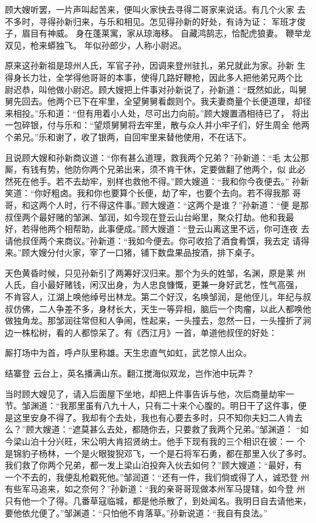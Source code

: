顾大嫂听罢，一片声叫起苦来，便叫火家快去寻得二哥家来说话。有几个火家
去不多时，寻得孙新归来，与乐和相见。怎见得孙新的好处，有诗为证：
军班才俊子，眉目有神威。
身在蓬莱寓，家从琼海移。
自藏鸿鹄志，恰配虎狼妻。
鞭举龙双见，枪来蟒独飞。
年似孙郎少，人称小尉迟。

原来这孙新祖是琼州人氏，军官子孙，因调来登州驻扎，弟兄就此为家。孙新
生得身长力壮，全学得他哥哥的本事，使得几路好鞭枪，因此多人把他弟兄两个比
尉迟恭，叫他做小尉迟。顾大嫂把上件事对孙新说了，孙新道：“既然如此，叫舅
舅先回去。他两个已下在牢里，全望舅舅看觑则个。我夫妻商量个长便道理，却径
来相投。”乐和道：“但有用着小人处，尽可出力向前。”顾大嫂置酒相待已了，
将出一包碎银，付与乐和：“望烦舅舅将去牢里，散与众人并小牢子们，好生周全
他两个弟兄。”乐和谢了，收了银两，自回牢里来替他使用，不在话下。

且说顾大嫂和孙新商议道：“你有甚么道理，救我两个兄弟？”孙新道：“毛
太公那厮，有钱有势，他防你两个兄弟出来，须不肯干休，定要做翻了他两个，似
此必然死在他手。若不去劫牢，别样也救他不得。”顾大嫂道：“我和你今夜便去。”
孙新笑道：“你好粗卤。我和你也要算个长便，劫了牢，也要个去向。若不得我那
哥哥，和这两个人时，行不得这件事。”顾大嫂道：“这两个是谁？”孙新道：“便
是那叔侄两个最好赌的邹渊、邹润，如今现在登云山台峪里，聚众打劫。他和我最
好，若得他两个相帮助，此事便成。”顾大嫂道：“登云山离这里不远，你可连夜
去请他叔侄两个来商议。”孙新道：“我如今便去。你可收拾了酒食肴馔，我去定
请得来。”顾大嫂分付火家，宰了一口猪，铺下数盘果品按酒，排下桌子。

天色黄昏时候，只见孙新引了两筹好汉归来。那个为头的姓邹，名渊，原是莱
州人氏，自小最好赌钱，闲汉出身，为人忠良慷慨，更兼一身好武艺，性气高强，
不肯容人，江湖上唤他绰号出林龙。第二个好汉，名唤邹润，是他侄儿，年纪与叔
叔仿佛，二人争差不多，身材长大，天生一等异相，脑后一个肉瘤，以此人都唤他
做独角龙。那邹润往常但和人争闹，性起来，一头撞去，忽然一日，一头撞折了涧
边一株松树，看的人都惊呆了。有《西江月》一首，单道他叔侄的好处：

厮打场中为首，呼卢队里称雄。天生忠直气如虹，武艺惊人出众。

结寨登
云台上，英名播满山东。翻江搅海似双龙，岂作池中玩弄？

当时顾大嫂见了，请入后面屋下坐地，却把上件事告诉与他，次后商量劫牢一
节。邹渊道：“我那里虽有八九十人，只有二十来个心腹的。明日干了这件事，便
是这里安身不得了。我却有个去处，我也有心要去多时，只不知你夫妇二人肯去
么？”顾大嫂道：“遮莫甚么去处，都随你去，只要救了我两个兄弟。”邹渊道：
“如今梁山泊十分兴旺，宋公明大肯招贤纳士。他手下现有我的三个相识在彼：一
个是锦豹子杨林，一个是火眼狻猊邓飞，一个是石将军石勇，都在那里入伙了多时。
我们救了你两个兄弟，都一发上梁山泊投奔入伙去如何？”顾大嫂道：“最好，有
一个不去的，我便乱枪戳死他。”邹润道：“还有一件，我们倘或得了人，诚恐登
州有些军马追来，如之奈何？”孙新道：“我的亲哥哥现做本州军马提辖，如今登
州只有他一个了得。几番草寇临城，都是他杀散了，到处闻名。我明日自去请他来，
要他依允便了。”邹渊道：“只怕他不肯落草。”孙新说道：“我自有良法。”

